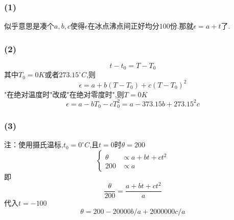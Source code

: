 \documentclass{article}
\begin{document}
\subsubsection*{(1)}
似乎意思是凑个$a,b,c$使得$\epsilon$在冰点沸点间正好均分$100$份.那就$\epsilon=a+t$了.
\subsubsection*{(2)}
\begin{equation}
	t-t_0 = T-T_0
\end{equation}
其中$T_0=0K$或者$273.15 ^{\circ}C$,则
\begin{equation}
	\epsilon = a+b(T-T_0)+c(T-T_0)^2
\end{equation}
"在绝对温度时"改成"在绝对零度时",则$T=0K$
\begin{equation}
\epsilon = a-b T_0 -cT_0^2 = a - 373.15 b +  273.15^2 c
\end{equation}
\subsubsection*{(3)}
注：使用摄氏温标,$t_0=0^{\circ}C$,且$t=0$时$\theta=200$
\begin{equation}
\left\{\begin{aligned}
\theta &\propto a+bt+ct^2 \\
200    &\propto a
\end{aligned}\right.
\end{equation}即
\begin{equation}
\frac{\theta}{200}=\frac{a+bt+ct^2}{a}
\end{equation}
代入$t=-100$
\begin{equation}
\theta = 200 - 20000b/a + 2000000 c/a
\end{equation}
\end{document}
